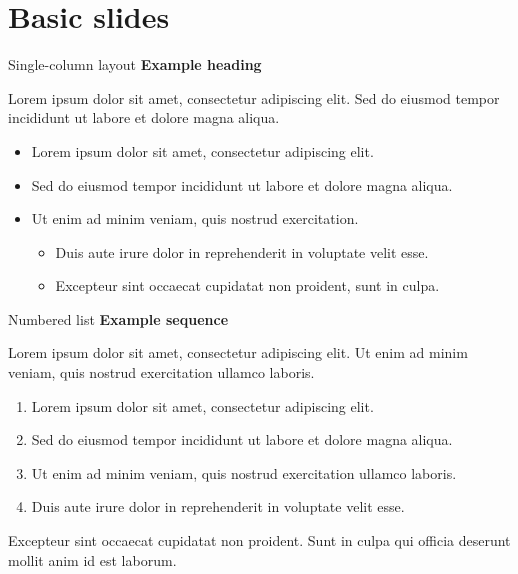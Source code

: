 \section{Basic slides}

\begin{frame}[t]{Single-column layout}
    \textbf{Example heading}
    \par\medskip
    Lorem ipsum dolor sit amet, consectetur adipiscing elit. Sed do eiusmod
    tempor incididunt ut labore et dolore magna aliqua.
    \par\medskip
    \begin{itemize}
        \item Lorem ipsum dolor sit amet, consectetur adipiscing elit.
        \item Sed do eiusmod tempor incididunt ut labore et dolore magna aliqua.
        \item Ut enim ad minim veniam, quis nostrud exercitation.
            \begin{itemize}
                \item Duis aute irure dolor in reprehenderit in voluptate velit esse.
                \item Excepteur sint occaecat cupidatat non proident, sunt in culpa.
            \end{itemize}
    \end{itemize}
\end{frame}

\begin{frame}[t]{Numbered list}
    \textbf{Example sequence}
    \par\medskip
    Lorem ipsum dolor sit amet, consectetur adipiscing elit. Ut enim ad minim
    veniam, quis nostrud exercitation ullamco laboris.
    \par\medskip
    \begin{enumerate}
        \item Lorem ipsum dolor sit amet, consectetur adipiscing elit.
        \item Sed do eiusmod tempor incididunt ut labore et dolore magna aliqua.
        \item Ut enim ad minim veniam, quis nostrud exercitation ullamco laboris.
        \item Duis aute irure dolor in reprehenderit in voluptate velit esse.
    \end{enumerate}
    \medskip
    Excepteur sint occaecat cupidatat non proident. Sunt in culpa qui officia
    deserunt mollit anim id est laborum.
\end{frame}
